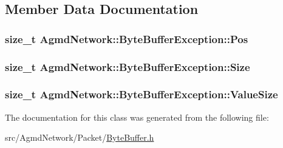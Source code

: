\subsection{Member Data Documentation}
\hypertarget{class_agmd_network_1_1_byte_buffer_exception_a6b4c1bdfe4ed95435e94af7766303125}{
\subsubsection[{Pos}]{\setlength{\rightskip}{0pt plus 5cm}size\+\_\+t Agmd\+Network\+::\+Byte\+Buffer\+Exception\+::\+Pos\hspace{0.3cm}{\ttfamily [protected]}}}\label{class_agmd_network_1_1_byte_buffer_exception_a6b4c1bdfe4ed95435e94af7766303125}
\hypertarget{class_agmd_network_1_1_byte_buffer_exception_a4040428cb697f99cb4dbab00c1fe6fd3}{
\subsubsection[{Size}]{\setlength{\rightskip}{0pt plus 5cm}size\+\_\+t Agmd\+Network\+::\+Byte\+Buffer\+Exception\+::\+Size\hspace{0.3cm}{\ttfamily [protected]}}}\label{class_agmd_network_1_1_byte_buffer_exception_a4040428cb697f99cb4dbab00c1fe6fd3}
\hypertarget{class_agmd_network_1_1_byte_buffer_exception_ae28dfd2f4d2c0c8a4180f14d9d5b7d0b}{
\subsubsection[{Value\+Size}]{\setlength{\rightskip}{0pt plus 5cm}size\+\_\+t Agmd\+Network\+::\+Byte\+Buffer\+Exception\+::\+Value\+Size\hspace{0.3cm}{\ttfamily [protected]}}}\label{class_agmd_network_1_1_byte_buffer_exception_ae28dfd2f4d2c0c8a4180f14d9d5b7d0b}


The documentation for this class was generated from the following file\+:\begin{DoxyCompactItemize}
\item 
src/\+Agmd\+Network/\+Packet/\hyperlink{_byte_buffer_8h}{Byte\+Buffer.\+h}\end{DoxyCompactItemize}
